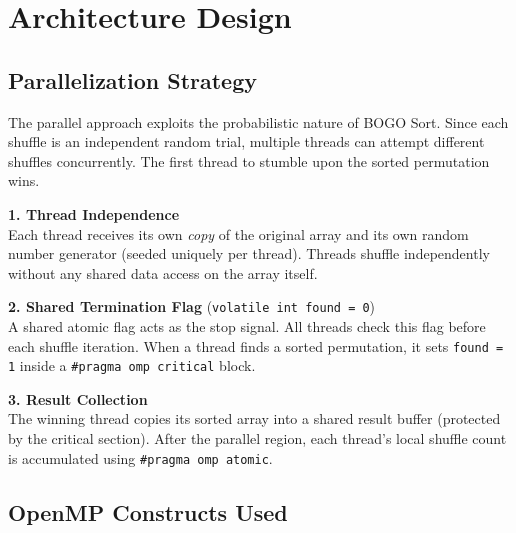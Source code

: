 \documentclass[11pt]{article}
\begin{document}
\newpage

\section{Architecture Design}

\subsection{Parallelization Strategy}

The parallel approach exploits the probabilistic nature of BOGO Sort. Since each shuffle is an independent random trial, multiple threads can attempt different shuffles concurrently. The first thread to stumble upon the sorted permutation wins.

\begin{shadedbox}
\textbf{1. Thread Independence} \\
Each thread receives its own \textit{copy} of the original array and its own random number generator (seeded uniquely per thread). Threads shuffle independently without any shared data access on the array itself.

\vspace{6pt}
\textbf{2. Shared Termination Flag} (\texttt{volatile int found = 0}) \\
A shared atomic flag acts as the stop signal. All threads check this flag before each shuffle iteration. When a thread finds a sorted permutation, it sets \texttt{found = 1} inside a \texttt{\#pragma omp critical} block.

\vspace{6pt}
\textbf{3. Result Collection} \\
The winning thread copies its sorted array into a shared result buffer (protected by the critical section). After the parallel region, each thread's local shuffle count is accumulated using \texttt{\#pragma omp atomic}.
\end{shadedbox}

\subsection{OpenMP Constructs Used}
\end{document}
